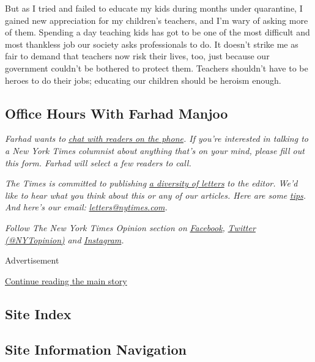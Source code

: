 But as I tried and failed to educate my kids during months under
quarantine, I gained new appreciation for my children's teachers, and
I'm wary of asking more of them. Spending a day teaching kids has got to
be one of the most difficult and most thankless job our society asks
professionals to do. It doesn't strike me as fair to demand that
teachers now risk their lives, too, just because our government couldn't
be bothered to protect them. Teachers shouldn't have to be heroes to do
their jobs; educating our children should be heroism enough.

\hypertarget{office-hours-with-farhad-manjoo}{%
\subsection{Office Hours With Farhad
Manjoo}\label{office-hours-with-farhad-manjoo}}

\emph{Farhad wants to}
\href{https://www.nytimes.com/2019/05/16/opinion/farhad-office-hours.html?module=inline}{\emph{chat
with readers on the phone}}\emph{. If you're interested in talking to a
New York Times columnist about anything that's on your mind, please fill
out this form. Farhad will select a few readers to call.}

\emph{The Times is committed to publishing}
\href{https://www.nytimes.com/2019/01/31/opinion/letters/letters-to-editor-new-york-times-women.html}{\emph{a
diversity of letters}} \emph{to the editor. We'd like to hear what you
think about this or any of our articles. Here are some}
\href{https://help.nytimes.com/hc/en-us/articles/115014925288-How-to-submit-a-letter-to-the-editor}{\emph{tips}}\emph{.
And here's our email:}
\href{mailto:letters@nytimes.com}{\emph{letters@nytimes.com}}\emph{.}

\emph{Follow The New York Times Opinion section on}
\href{https://www.facebook.com/nytopinion}{\emph{Facebook}}\emph{,}
\href{http://twitter.com/NYTOpinion}{\emph{Twitter (@NYTopinion)}}
\emph{and}
\href{https://www.instagram.com/nytopinion/}{\emph{Instagram}}\emph{.}

Advertisement

\protect\hyperlink{after-bottom}{Continue reading the main story}

\hypertarget{site-index}{%
\subsection{Site Index}\label{site-index}}

\hypertarget{site-information-navigation}{%
\subsection{Site Information
Navigation}\label{site-information-navigation}}

